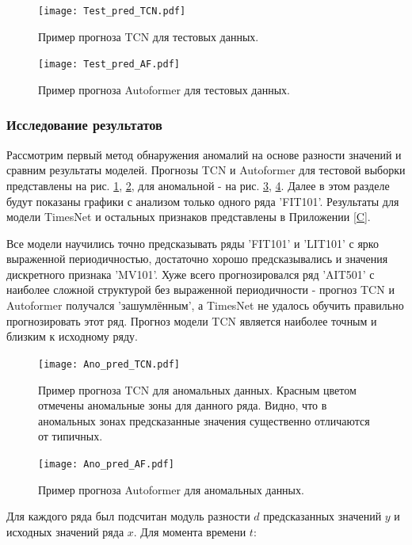 \documentclass{article}
\begin{document}
\begin{figure}[H]
\centering
\texttt{[image: Test\_pred\_TCN.pdf]}
\caption{Пример прогноза TCN для тестовых данных.}
\label{Test_TCN}
\end{figure}

\begin{figure}[H]
\centering
\texttt{[image: Test\_pred\_AF.pdf]}
\caption{Пример прогноза Autoformer для тестовых данных.}
\label{Test_AF}
\end{figure}

\subsubsection{Исследование результатов}

Рассмотрим первый метод обнаружения аномалий на основе разности значений и сравним результаты моделей. Прогнозы TCN и Autoformer для тестовой выборки представлены на рис. \ref{Test_TCN}, \ref{Test_AF}, для аномальной - на рис.  \ref{Ano_TCN}, \ref{Ano_AF}. Далее в этом разделе будут показаны графики с анализом только одного ряда 'FIT101'. Результаты для модели TimesNet и остальных признаков представлены в Приложении \ref{C}.

Все модели научились точно предсказывать ряды 'FIT101' и 'LIT101' с ярко выраженной периодичностью, достаточно хорошо предсказывались и значения дискретного признака 'MV101'. Хуже всего прогнозировался ряд 'AIT501' с наиболее сложной структурой без выраженной периодичности - прогноз TCN и Autoformer получался 'зашумлённым', а TimesNet не удалось обучить правильно прогнозировать этот ряд. Прогноз модели TCN является наиболее точным и близким к исходному ряду. 

\begin{figure}[h]
\centering
\texttt{[image: Ano\_pred\_TCN.pdf]}
\caption{Пример прогноза TCN для аномальных данных. Красным цветом отмечены аномальные зоны для данного ряда. Видно, что в аномальных зонах предсказанные значения существенно отличаются от типичных.}
\label{Ano_TCN}
\end{figure}

\begin{figure}[h]
\centering
\texttt{[image: Ano\_pred\_AF.pdf]}
\caption{Пример прогноза Autoformer для аномальных данных.}
\label{Ano_AF}
\end{figure}

Для каждого ряда был подсчитан модуль разности $d$ предсказанных значений $y$ и исходных значений ряда $x$. Для момента времени $t$:
\end{document}
